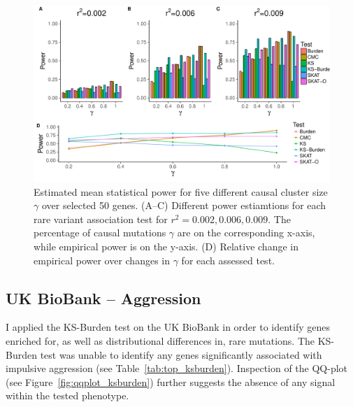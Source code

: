 \begin{figure}[ht!]
  \centering
  \includegraphics[width=1.0\linewidth]{ksburden/figures/combined_power_analysis.pdf}
  \caption[Estimated mean statistical power]{Estimated mean statistical power for five different causal cluster size $\gamma$ over selected 50 genes.
    (A--C) Different power estiamtions for each rare variant association test for $r^2=0.002, 0.006, 0.009$.
    The percentage of causal mutations $\gamma$ are on the corresponding x-axis, while empirical power is on the y-axis.
    (D) Relative change in empirical power over changes in $\gamma$ for each assessed test.\label{fig:simulatedGeneRealData}}
\end{figure}


\subsection{UK BioBank -- Aggression}
\label{sub:ukbiobank_aggression}

I applied the KS-Burden test on the UK BioBank in order to identify genes enriched for, as well as distributional differences in, rare mutations. 
The KS-Burden test was unable to identify any genes significantly associated with impulsive aggression (see Table~\ref{tab:top_ksburden}).
Inspection of the QQ-plot (see Figure~\ref{fig:qqplot_ksburden}) further suggests the absence of any signal within the tested phenotype.

